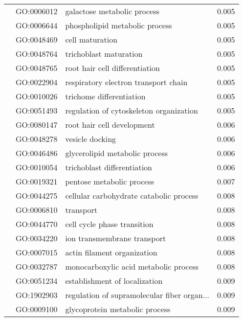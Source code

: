 \begin{longtable}{lllr}
   & GO:0006012 &                  galactose metabolic process &         0.005 \\
   & GO:0006644 &               phospholipid metabolic process &         0.005 \\
   & GO:0048469 &                              cell maturation &         0.005 \\
   & GO:0048764 &                       trichoblast maturation &         0.005 \\
   & GO:0048765 &               root hair cell differentiation &         0.005 \\
   & GO:0022904 &         respiratory electron transport chain &         0.005 \\
   & GO:0010026 &                     trichome differentiation &         0.005 \\
   & GO:0051493 &      regulation of cytoskeleton organization &         0.005 \\
   & GO:0080147 &                   root hair cell development &         0.006 \\
   & GO:0048278 &                              vesicle docking &         0.006 \\
   & GO:0046486 &               glycerolipid metabolic process &         0.006 \\
   & GO:0010054 &                  trichoblast differentiation &         0.006 \\
   & GO:0019321 &                    pentose metabolic process &         0.007 \\
   & GO:0044275 &      cellular carbohydrate catabolic process &         0.008 \\
   & GO:0006810 &                                    transport &         0.008 \\
   & GO:0044770 &                  cell cycle phase transition &         0.008 \\
   & GO:0034220 &                  ion transmembrane transport &         0.008 \\
   & GO:0007015 &                  actin filament organization &         0.008 \\
   & GO:0032787 &        monocarboxylic acid metabolic process &         0.008 \\
   & GO:0051234 &                establishment of localization &         0.009 \\
   & GO:1902903 &  regulation of supramolecular fiber organ... &         0.009 \\
   & GO:0009100 &               glycoprotein metabolic process &         0.009 \\

\end{longtable}
